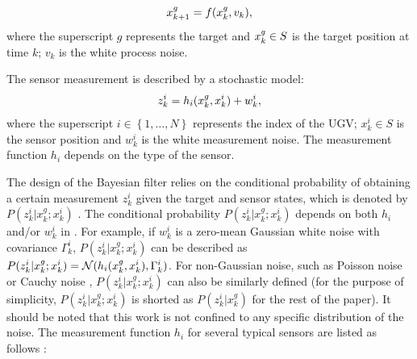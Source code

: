 	\begin{equation}
		\small
		\label{eqn:tar_motion_model}
		\xg_{k+1}=f(\xg_k,v_k), %
	\end{equation}\normalsize
	where the superscript $g$ represents the target and $x^g_k\in S$ is the target position at time $k$;
	$v_k$ is the white process noise.
	
	The sensor measurement is described by a stochastic model:
	\small\begin{equation}\label{eqn:meas_model}
		z^i_k = h_i(x^g_k,x^i_k)+w^i_k,
	\end{equation}\normalsize
	where the superscript $i\in\left\lbrace 1,\dots,N\right\rbrace$ represents the index of the UGV; $x^i_k\in S$ is the sensor position and $w^i_k$ is the white measurement noise.
	The measurement function $h_i$ depends on the type of the sensor. 
	
	The design of the Bayesian filter relies on the conditional probability of obtaining a certain measurement $z^i_k$ given the target and sensor states, which is denoted by $P(z^i_k|x^g_k;x^i_k)$ \cite{thrun2005probabilistic}. 	
	The conditional probability $P(z^i_k|x^g_k;x^i_k)$ depends on both $h_i$ and/or $w^i_k$ in .
	For example, if $w^i_k$ is a zero-mean Gaussian white noise with covariance $\Gamma_k^i$, $P(z^i_k|x^g_k;x^i_k)$ can be described as $P(z^i_k|x^g_k;x^i_k)=\mathcal{N}(h_i(x^g_k,x^i_k),\Gamma_k^i)$.
	For non-Gaussian noise, such as Poisson noise or Cauchy noise \cite{kitagawa1996monte}, $P(z^i_k|x^g_k;x^i_k)$ can also be similarly defined (for the purpose of simplicity, $P(z^i_k|x^g_k;x^i_k)$ is shorted as $P(z^i_k|x^g_k)$ for the rest of the paper). 
	It should be noted that this work is not confined to any specific distribution of the noise.
	The measurement function $h_i$ for several typical sensors are listed as follows \cite{bishop2010optimality}:
	
